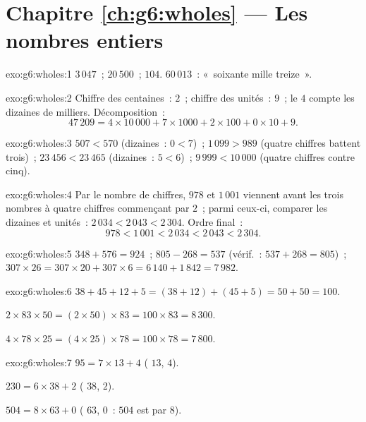 \section*{Chapitre \ref{ch:g6:wholes} --- Les nombres entiers}

\begin{solution}{exo:g6:wholes:1}
$3\,047$~; \quad $20\,500$~; \quad $104$. \quad
$60\,013$~: «~soixante mille treize~».
\end{solution}

\begin{solution}{exo:g6:wholes:2}
Chiffre des centaines~: $2$~; chiffre des unités~: $9$~; le $4$
compte les dizaines de milliers. Décomposition~:
\[
47\,209 = 4 \times 10\,000 + 7 \times 1000 + 2 \times 100 + 0 \times 10
+ 9 .
\]
\end{solution}

\begin{solution}{exo:g6:wholes:3}
$507 < 570$ (dizaines~: $0 < 7$)~; \quad
$1\,099 > 989$ (quatre chiffres battent trois)~; \quad
$23\,456 < 23\,465$ (dizaines~: $5 < 6$)~; \quad
$9\,999 < 10\,000$ (quatre chiffres contre cinq).
\end{solution}

\begin{solution}{exo:g6:wholes:4}
Par le nombre de chiffres, $978$ et $1\,001$ viennent avant les
trois nombres à quatre chiffres commençant par $2$~; parmi ceux-ci,
comparer les dizaines et unités~: $2\,034 < 2\,043 < 2\,304$. Ordre
final~:
\[
978 < 1\,001 < 2\,034 < 2\,043 < 2\,304 .
\]
\end{solution}

\begin{solution}{exo:g6:wholes:5}
$348 + 576 = 924$~; \quad $805 - 268 = 537$ (vérif.~:
$537 + 268 = 805$)~; \quad $307 \times 26 = 307 \times 20 + 307 \times 6
= 6\,140 + 1\,842 = 7\,982$.
\end{solution}

\begin{solution}{exo:g6:wholes:6}
$38 + 45 + 12 + 5 = (38 + 12) + (45 + 5) = 50 + 50 = 100$.

$2 \times 83 \times 50 = (2 \times 50) \times 83 = 100 \times 83 =
8\,300$.

$4 \times 78 \times 25 = (4 \times 25) \times 78 = 100 \times 78 =
7\,800$.
\end{solution}

\begin{solution}{exo:g6:wholes:7}
$95 = 7 \times 13 + 4$ ( $13$,  $4$).

$230 = 6 \times 38 + 2$ ( $38$,  $2$).

$504 = 8 \times 63 + 0$ ( $63$,  $0$~: $504$ est
 par $8$).
\end{solution}

